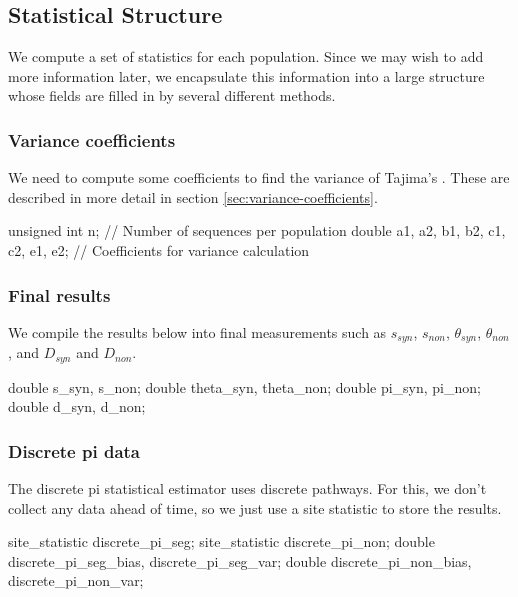 \documentclass{article}
\begin{document}
    \subsection{Statistical Structure}
      \label{sec:statistical-structure}

      We compute a set of statistics for each population. Since we may wish to
      add more information later, we encapsulate this information into a large
      structure whose fields are filled in by several different methods.

\begin{ccode}
typedef struct {
\end{ccode}

      \subsubsection{Variance coefficients}

	We need to compute some coefficients to find the variance of Tajima's
	\D{}. These are described in more detail in section
	\ref{sec:variance-coefficients}.

\begin{ccode}
  unsigned int		n;     		// Number of sequences per population
  double		a1, a2, b1, b2,
			c1, c2, e1, e2;	// Coefficients for variance calculation
\end{ccode}

      \subsubsection{Final results}

	We compile the results below into final measurements such as $s_{syn}$,
	$s_{non}$, $\theta_{syn}$, $\theta_{non}$, and $D_{syn}$ and $D_{non}$.

\begin{ccode}
  double		s_syn,		s_non;
  double		theta_syn,	theta_non;
  double		pi_syn,		pi_non;
  double		d_syn,		d_non;
\end{ccode}

      \subsubsection{Discrete pi data}

	The discrete pi statistical estimator uses discrete pathways. For this,
        we don't collect any data ahead of time, so we just use a site statistic
	to store the results.

\begin{ccode}
  site_statistic	discrete_pi_seg;
  site_statistic	discrete_pi_non;
  double		discrete_pi_seg_bias, discrete_pi_seg_var;
  double		discrete_pi_non_bias, discrete_pi_non_var;
\end{ccode}
\end{document}

